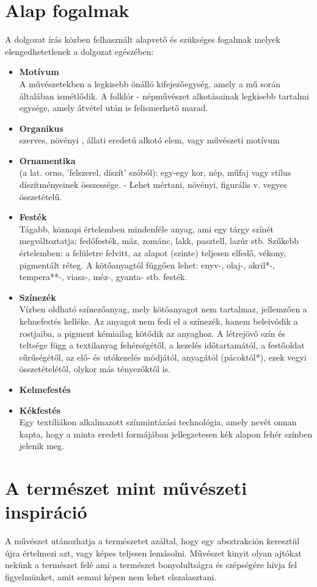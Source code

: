 \documentclass[fontsize=12pt, appendixprefix=true]{scrreprt}
\begin{document}
\section{Alap fogalmak}
A dolgozat írás közben felhasznált alapvető és szükséges fogalmak melyek elengedhetetlenek a dolgozat egészében:
\begin{itemize}
	\item \textbf{Motívum} \\  A művészetekben a legkisebb önálló kifejezőegység, amely a mű során általában ismétlődik. A folklór - népművészet alkotásainak legkisebb tartalmi egysége, amely átvétel után is felismerhető marad.
	\item \textbf{Organikus} \\ szerves, növényi , állati eredetű alkotó elem, vagy művészeti motívum
	\item \textbf{Ornamentika} \\ (a lat. orno, 'felszerel, díszít' szóból): egy-egy kor, nép, műfaj vagy stílus díszítményeinek összessége. - Lehet mértani, növényi, figurális v. vegyes összetételű.
	\item \textbf{Festék} \\ Tágabb, köznapi értelemben mindenféle anyag, ami egy tárgy színét megváltoztatja: fedőfesték, máz, zománc, lakk, pasztell, lazúr stb. Szűkebb értelemben: a felületre felvitt, az alapot (szinte) teljesen elfedő, vékony, pigmentált réteg. A kötőanyagtól függően lehet: enyv-, olaj-, akril*-, tempera**-, viasz-, méz-, gyanta- stb. festék.
	\item \textbf{Színezék} \\
	Vízben oldható színezőanyag, mely kötőanyagot nem tartalmaz, jellemzően a kelmefestés kelléke. Az anyagot nem fedi el a színezék, hanem beleivódik a rostjaiba, a pigment kémiailag kötődik az anyaghoz. A létrejövő szín és teltsége függ a textilanyag fehérségétől, a kezelés időtartamától, a festőoldat sűrűségétől, az elő- és utókezelés módjától, anyagától (pácoktól*), ezek vegyi összetételétől, olykor más tényezőktől is.
	\item \textbf{Kelmefestés} \\
	\item \textbf{Kékfestés} \\ Egy textíliákon alkalmazott színmintázási technológia, amely nevét onnan kapta, hogy a minta eredeti formájában jellegzetesen kék alapon fehér színben jelenik meg.
	\end{itemize}

\section{A természet mint művészeti inspiráció}
A művészet utánozhatja a természetet azáltal, hogy egy absztrakción keresztül újra értelmezi azt, vagy képes teljesen lemásolni.
Művészet kinyit olyan ajtókat nekünk a természet felé ami a természet  bonyolultságra és szépségére hívja fel figyelmünket, amit semmi képen nem lehet elszalasztani.
\end{document}
